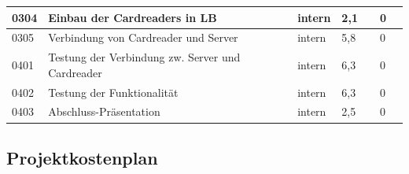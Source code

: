 \begin{center}
\begin{scriptsize}
\begin{tabularx}{\textwidth}{|p{0.8cm}|p{2.2cm}|X|X|X|X|X|}
    \hline
    0304 & Einbau der Cardreaders in LB & intern &2,1 & &0 & \\
    \hline
    0305 & Verbindung von Cardreader und Server & intern &5,8 & &0 & \\
    \hline
    0401 & Testung der Verbindung zw. Server und Cardreader & intern &6,3 & &0 & \\
    \hline
    0402 & Testung der Funktionalität & intern &6,3 & &0 & \\
    \hline
    0403 & Abschluss-Präsentation & intern &2,5 & &0 & \\
    \hline
\end{tabularx}
\end{scriptsize}
\end{center}
\endgroup

\newpage


\subsection{Projektkostenplan}



